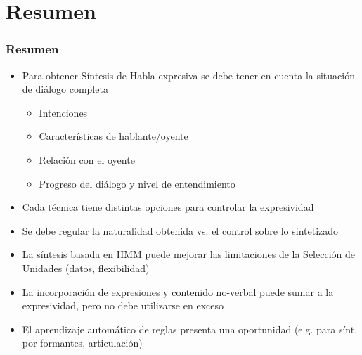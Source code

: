 \documentclass[10pt,presentation]{beamer}
\begin{document}
\section{Resumen}
\begin{frame}
  \frametitle{Resumen}
  \begin{itemize}
    \item \pause Para obtener Síntesis de Habla expresiva se debe tener en cuenta la situación de diálogo completa \pause
    \begin{itemize}
      \item Intenciones \pause
      \item Características de hablante/oyente \pause
      \item Relación con el oyente \pause
      \item Progreso del diálogo y nivel de entendimiento \pause
    \end{itemize}
    \item Cada técnica tiene distintas opciones para controlar la expresividad \pause
    \item Se debe regular la naturalidad obtenida vs. el control sobre lo sintetizado \pause
    \item La síntesis basada en HMM puede mejorar las limitaciones de la Selección de Unidades (datos, flexibilidad) \pause
    \item La incorporación de expresiones y contenido no-verbal puede sumar a la expresividad, pero no debe utilizarse en exceso \pause
    \item El aprendizaje automático de reglas presenta una oportunidad (e.g. para sínt. por formantes, articulación)
  \end{itemize}
\end{frame}

\begin{frame}%
  \titlepage
\end{frame}
\end{document}

